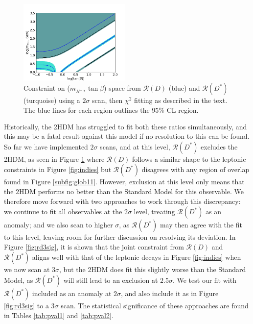\documentclass[a4paper,12pt]{article}
\begin{document}
\begin{figure}[ht]
    \centering
    \includegraphics[width=0.49\textwidth]{rd_both196sig.png}
    \caption{\label{fig:rds}Constraint on ($m_{H^+},\tan\beta$) space from $\mathcal{R}(D)$ (blue) and $\mathcal{R}(D^*)$ (turquoise) using a $2\sigma$ scan, then $\chi^2$ fitting as described in the text. 
    The blue lines for each region outlines the 95\% CL region.}
\end{figure}
Historically, the 2HDM has struggled to fit both these ratios simultaneously, and this may be a fatal result against this model if no resolution to this can be found. 
So far we have implemented $2\sigma$ scans, and at this level, $\mathcal{R}(D^*)$ excludes the 2HDM, as seen in Figure \ref{fig:rds} where $\mathcal{R}(D)$ follows a similar shape to the leptonic constraints in Figure \ref{fig:indies} but $\mathcal{R}(D^*)$ disagrees with any region of overlap found in Figure \ref{subfig:glob11}.
However, exclusion at this level only means that the 2HDM performs no better than the Standard Model for this observable. 
We therefore move forward with two approaches to work through this discrepancy: we continue to fit all observables at the $2\sigma$ level, treating $\mathcal{R}(D^*)$ as an anomaly; and we also scan to higher $\sigma$, as $\mathcal{R}(D^*)$ may then agree with the fit to this level, leaving room for further discussion on resolving its deviation.
In Figure \ref{fig:rd3sig}, it is shown that the joint constraint from $\mathcal{R}(D)$ and $\mathcal{R}(D^*)$ aligns well with that of the leptonic decays in Figure \ref{fig:indies} when we now scan at $3\sigma$, but the 2HDM does fit this slightly worse than the Standard Model, as $\mathcal{R}(D^*)$ will still lead to an exclusion at $2.5\sigma$. 
We test our fit with $\mathcal{R}(D^*)$ included as an anomaly at $2\sigma$, and also include it as in Figure \ref{fig:rd3sig} to a $3\sigma$ scan. 
The statistical significance of these approaches are found in Tables \ref{tab:pval1} and \ref{tab:pval2}.
\end{document}
